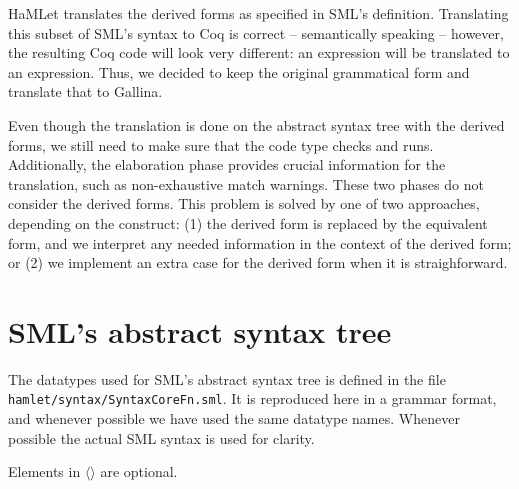 \documentclass[a4paper,11pt]{article}
\begin{document}
HaMLet translates the derived forms as specified in SML's definition.
Translating this subset of SML's syntax to Coq is correct -- semantically
speaking -- however, the resulting Coq code will look very different: an
 expression will be translated to an 
expression. Thus, we decided to keep the original grammatical form and
translate that to Gallina.

Even though the translation is done on the abstract syntax tree with the derived
forms, we still need to make sure that the code type checks and runs.
Additionally, the elaboration phase provides crucial information for the
translation, such as non-exhaustive match warnings. These two phases do not
consider the derived forms. This problem is solved by one of two approaches,
depending on the construct: (1) the derived form is replaced by the equivalent
form, and we interpret any needed information in the context of the derived
form; or (2) we implement an extra case for the derived form when it is
straighforward.


\section{SML's abstract syntax tree}

The datatypes used for SML's abstract syntax tree is defined in the file
\texttt{hamlet/syntax/SyntaxCoreFn.sml}. It is reproduced here in a grammar
format, and whenever possible we have used the same datatype names. Whenever
possible the actual SML syntax is used for clarity.

Elements in $\langle\rangle$ are optional.
\end{document}
